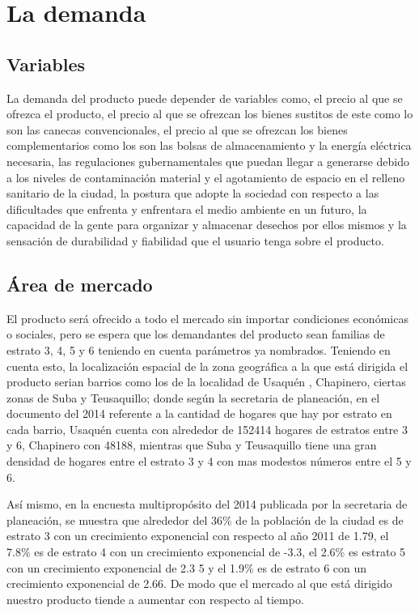 \documentclass[letterpaper,12pt]{scrreprt}
\begin{document}
\chapter{La demanda}

    \section{Variables}
    La demanda del producto puede depender de variables como, el precio al que se ofrezca el producto, el precio al que se ofrezcan los bienes sustitos de este como lo son las canecas convencionales, el precio al que se ofrezcan los bienes complementarios como los son las bolsas de almacenamiento y la energía eléctrica necesaria,  las regulaciones gubernamentales que puedan llegar a generarse debido a los niveles de contaminación material y el agotamiento de espacio en el relleno sanitario de la ciudad,  la postura que adopte la sociedad con respecto a las dificultades que enfrenta y enfrentara el medio ambiente en un futuro, la capacidad de la gente para organizar y almacenar desechos por ellos mismos y la sensación de durabilidad y fiabilidad que el usuario tenga sobre el producto.

    \section{Área de mercado}
    El producto será ofrecido a todo el mercado sin importar condiciones económicas o sociales, pero se espera que los demandantes del producto sean  familias de estrato 3, 4, 5 y 6 teniendo en cuenta parámetros ya nombrados. Teniendo en cuenta esto, la localización espacial de la zona geográfica a la que está dirigida el producto serian barrios como los de la localidad de Usaquén , Chapinero, ciertas zonas de Suba y Teusaquillo; donde según la secretaria de planeación, en el documento del 2014 referente a la cantidad de hogares que hay por estrato en cada barrio, Usaquén cuenta con alrededor de 152414 hogares de estratos entre 3 y 6, Chapinero con 48188, mientras que Suba y Teusaquillo tiene una gran densidad de hogares entre el estrato 3 y 4 con mas modestos números entre el 5 y 6.

    Así mismo, en la encuesta multipropósito del 2014 publicada por la secretaria de planeación, se muestra que  alrededor del 36\% de la población de la ciudad es de estrato 3 con un crecimiento exponencial con respecto al año 2011 de 1.79, el 7.8\%  es de estrato 4 con un crecimiento exponencial de -3.3, el 2.6\% es estrato 5 con un crecimiento exponencial de 2.3 5 y el 1.9\% es de estrato 6 con un crecimiento exponencial de 2.66. De modo que el mercado al que está dirigido nuestro producto tiende a aumentar con respecto al tiempo.
\end{document}
